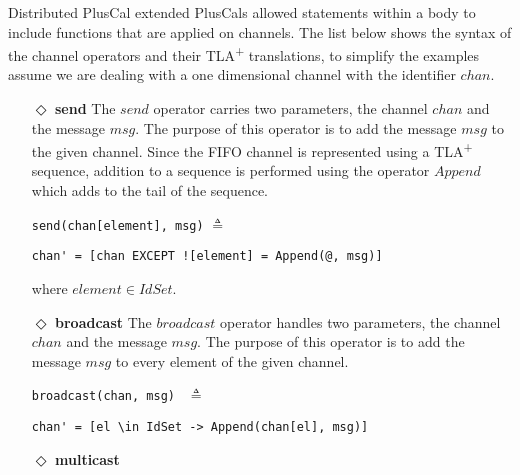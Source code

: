 \documentclass{thesul}
\newcommand{\tlaplus}{TLA\textsuperscript{+}\xspace}
\begin{document}
Distributed PlusCal extended PlusCals allowed statements within a body to include functions that are applied on channels.
The list below shows the syntax of the channel operators and their \tlaplus translations, to simplify the examples assume we are dealing with a one dimensional channel with the identifier $chan$.

\begin{itemize}

\item[$\Diamond$]  \textbf{send} The $send$ operator carries two parameters, the channel $chan$ and the message $msg$. The purpose of this operator is to add the message $msg$ to
the given channel. Since the FIFO channel is represented using a \tlaplus sequence, addition to a sequence is performed using the operator $Append$ which adds to the tail of the sequence.

\begin{minipage}{.3\textwidth}

\lstinline|send(chan[element], msg)| $\triangleq$
\end{minipage}\hfill
\begin{minipage}{.7\textwidth}
\begin{lstlisting}[frame = none, numbers = none]
chan' = [chan EXCEPT ![element] = Append(@, msg)]\end{lstlisting}

\end{minipage}\hfill
where $element \in IdSet$.


\item[$\Diamond$]  \textbf{broadcast}
The $broadcast$ operator handles two parameters, the channel $chan$ and the message $msg$. The purpose of this operator is to add the message $msg$ to every element of the given channel.

\begin{minipage}{.25\textwidth}

\lstinline|broadcast(chan, msg) | $\triangleq$
\end{minipage}\hfill
\begin{minipage}{.7\textwidth}
\begin{lstlisting}[frame = none, numbers = none]
chan' = [el \in IdSet -> Append(chan[el], msg)]
\end{lstlisting}

\end{minipage}\hfill

\item[$\Diamond$] \textbf{multicast}


\end{itemize}
\end{document}
